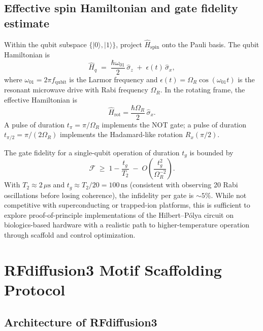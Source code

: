 \documentclass[11pt,oneside]{amsbook}
\numberwithin{equation}{section}
\theoremstyle{plain}
\theoremstyle{definition}
\theoremstyle{remark}
\begin{document}
\subsection{Effective spin Hamiltonian and gate fidelity estimate}
\label{subsec:pqpu_hamiltonian}

Within the qubit subspace $\{|0\rangle, |1\rangle\}$, project
$\hat{H}_{\text{spin}}$ onto the Pauli basis.  The qubit Hamiltonian is
\begin{equation}
  \hat{H}_q \;=\; \frac{\hbar\omega_{01}}{2}\,\hat{\sigma}_z
  \;+\; \epsilon(t)\,\hat{\sigma}_x,
\label{eq:H_qubit}
\end{equation}
where $\omega_{01} = 2\pi f_{\text{qubit}}$ is the Larmor frequency and
$\epsilon(t) = \Omega_R \cos(\omega_{01} t)$ is the resonant microwave drive with
Rabi frequency $\Omega_R$.  In the rotating frame, the effective Hamiltonian is
\begin{equation}
  \hat{H}_{\text{rot}} = \frac{\hbar\Omega_R}{2}\,\hat{\sigma}_x.
\label{eq:H_rot}
\end{equation}
A pulse of duration $t_\pi = \pi/\Omega_R$ implements the NOT gate;
a pulse of duration $t_{\pi/2} = \pi/(2\Omega_R)$ implements the Hadamard-like
rotation $R_x(\pi/2)$.

The gate fidelity for a single-qubit operation of duration $t_g$ is bounded by
\[
  \mathcal{F} \;\ge\; 1 - \frac{t_g}{T_2} \;-\; O\!\left(\frac{t_g^2}{\Omega_R^{-2}}\right).
\]
With $T_2 \approx 2\,\mu\text{s}$ and $t_g \approx T_2/20 = 100\,\text{ns}$
(consistent with observing 20 Rabi oscillations before losing coherence), the
infidelity per gate is $\sim 5\%$.  While not competitive with superconducting
or trapped-ion platforms, this is sufficient to explore proof-of-principle
implementations of the Hilbert--P\'olya circuit on biologics-based hardware with a realistic path to higher-temperature operation through scaffold and control optimization.

\section{RFdiffusion3 Motif Scaffolding Protocol}
\label{sec:pqpu_rfd3}

\subsection{Architecture of RFdiffusion3}
\label{subsec:pqpu_rfd3_arch}
\end{document}
